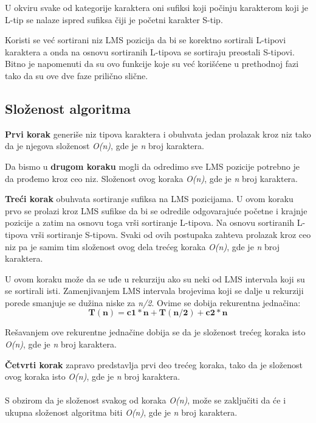 \documentclass[serbian]{article}
\begin{document}
U okviru svake od kategorije karaktera oni sufiksi koji počinju karakterom koji je L-tip se nalaze ispred sufiksa čiji je početni karakter S-tip.

Koristi se već sortirani niz LMS pozicija da bi se korektno sortirali L-tipovi karaktera a onda na osnovu sortiranih L-tipova se sortiraju preostali S-tipovi. Bitno je napomenuti da su ovo funkcije koje su već korišćene u prethodnoj fazi tako da su ove dve faze prilično slične.

\subsection{Složenost algoritma}

\textbf{Prvi korak} generiše niz tipova karaktera i obuhvata jedan prolazak kroz niz tako da je njegova složenost \textit{O(n)}, gde je \textit{n} broj karaktera.

Da bismo u \textbf{drugom koraku} mogli da odredimo sve LMS pozicije potrebno je da prođemo kroz ceo niz. Složenost ovog koraka \textit{O(n)}, gde je \textit{n} broj karaktera.

\textbf{Treći korak} obuhvata sortiranje sufiksa na LMS pozicijama. U ovom koraku prvo se prolazi kroz LMS sufikse da bi se odredile odgovarajuće početne i krajnje pozicije a zatim na osnovu toga vrši sortiranje L-tipova. Na osnovu sortiranih L-tipova vrši sortiranje S-tipova. Svaki od ovih postupaka zahteva prolazak kroz ceo niz pa je samim tim složenost ovog dela trećeg koraka \textit{O(n)}, gde je \textit{n} broj karaktera.

U ovom koraku može da se uđe u rekurziju ako su neki od LMS intervala koji su se sortirali isti. Zamenjivanjem LMS intervala brojevima koji se dalje u rekurziji porede smanjuje se dužina niske za \textit{n/2}. Ovime se dobija rekurentna jednačina:
\begin{equation}
\mathbf{T(n) = c1 * n + T(n/2) + c2 * n}
\end{equation}

Rešavanjem ove rekurentne jednačine dobija se da je složenost trećeg koraka isto \textit{O(n)}, gde je \textit{n} broj karaktera.

\textbf{Četvrti korak} zapravo predstavlja prvi deo trećeg koraka, tako da je složenost ovog koraka isto \textit{O(n)}, gde je \textit{n} broj karaktera.
\\\\
S obzirom da je složenost svakog od koraka \textit{O(n)}, može se zaključiti da će i ukupna složenost algoritma biti \textit{O(n)}, gde je \textit{n} broj karaktera.
\end{document}
